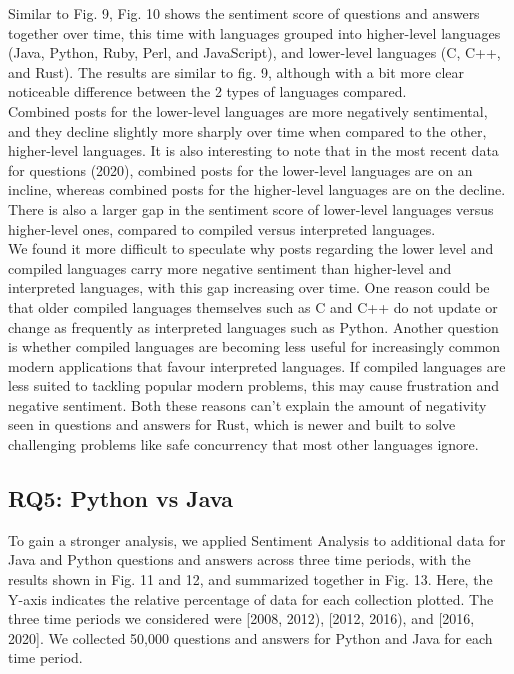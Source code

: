 \documentclass[conference]{IEEEtran}
\begin{document}
Similar to Fig. 9, Fig. 10 shows the sentiment score of questions and answers together over time, this time with languages grouped into higher-level languages (Java, Python, Ruby, Perl, and JavaScript), and lower-level languages (C, C++, and Rust). The results are similar to fig. 9, although with a bit more clear noticeable difference between the 2 types of languages compared.\\

Combined posts for the lower-level languages are more negatively sentimental, and they decline slightly more sharply over time when compared to the other, higher-level languages. It is also interesting to note that in the most recent data for questions (2020), combined posts for the lower-level languages are on an incline, whereas combined posts for the higher-level languages are on the decline. There is also a larger gap in the sentiment score of lower-level languages versus higher-level ones, compared to compiled versus interpreted languages.\\

We found it more difficult to speculate why posts regarding the lower level and compiled languages carry more negative sentiment than higher-level and interpreted languages, with this gap increasing over time. One reason could be that older compiled languages themselves such as C and C++ do not update or change as frequently as interpreted languages such as Python. Another question is whether compiled languages are becoming less useful for increasingly common modern applications that favour interpreted languages. If compiled languages are less suited to tackling popular modern problems, this may cause frustration and negative sentiment. Both these reasons can't explain the amount of negativity seen in questions and answers for Rust, which is newer and built to solve challenging problems like safe concurrency that most other languages ignore\cite{b40}.


\subsection{RQ5: Python vs Java}
To gain a stronger analysis, we applied Sentiment Analysis to additional data for Java and Python questions and answers across three time periods, with the results shown in Fig. 11 and 12, and summarized together in Fig. 13. Here, the Y-axis indicates the relative percentage of data for each collection plotted. The three time periods we considered were [2008, 2012), [2012, 2016), and [2016, 2020]. We collected 50,000 questions and answers for Python and Java for each time period. \\
\end{document}
